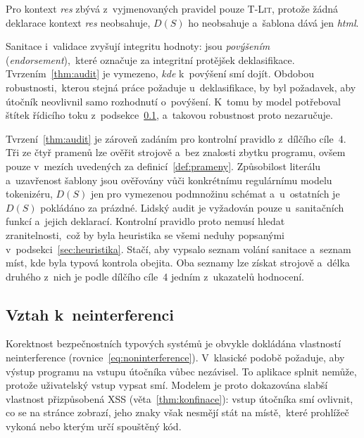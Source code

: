 Pro kontext \emph{res} zbývá z~vyjmenovaných pravidel pouze \textsc{T-Lit}, protože žádná deklarace kontext \emph{res} neobsahuje, $D(S)$ ho neobsahuje a~šablona dává jen \emph{html}.

Sanitace i~validace zvyšují integritu hodnoty: jsou \emph{povýšením} (\emph{endorsement}),~které \textcite{zdancewic2003robust} označuje za integritní protějšek deklasifikace. Tvrzením~\ref{thm:audit} je vymezeno, \emph{kde} k~povýšení smí dojít. Obdobou robustnosti,~kterou stejná práce požaduje u~deklasifikace, by byl požadavek, aby útočník neovlivnil samo rozhodnutí o~povýšení. K~tomu by model potřeboval štítek řídicího toku z~podsekce~\ref{sec:model-neinterference}, a~takovou robustnost proto nezaručuje.

Tvrzení~\ref{thm:audit} je zároveň zadáním pro kontrolní pravidlo z~dílčího cíle~4. Tři ze čtyř pramenů lze ověřit strojově a~bez znalosti zbytku programu, ovšem pouze v~mezích uvedených za definicí~\ref{def:prameny}. Způsobilost literálu a~uzavřenost šablony jsou ověřovány vůči konkrétnímu regulárnímu modelu tokenizéru, $D(S)$ jen pro vymezenou podmnožinu schémat a~u~ostatních je $D(S)$ pokládáno za prázdné. Lidský audit je vyžadován pouze u~sanitačních funkcí a~jejich deklarací. Kontrolní pravidlo proto nemusí hledat zranitelnosti,~což by byla heuristika se všemi neduhy popsanými v~podsekci~\ref{sec:heuristika}. Stačí, aby vypsalo seznam volání sanitace a~seznam míst, kde byla typová kontrola obejita. Oba seznamy lze získat strojově a~délka druhého z~nich je podle dílčího cíle~4 jedním z~ukazatelů hodnocení.

\subsection{Vztah k~neinterferenci}
\label{sec:model-neinterference}

Korektnost bezpečnostních typových systémů je obvykle dokládána vlastností neinterference (rovnice~\ref{eq:noninterference}). V~klasické podobě požaduje, aby výstup programu na vstupu útočníka vůbec nezávisel. To aplikace splnit nemůže, protože uživatelský vstup vypsat smí. Modelem je proto dokazována slabší vlastnost přizpůsobená XSS (věta~\ref{thm:konfinace}): vstup útočníka smí ovlivnit, co se na stránce zobrazí, jeho znaky však nesmějí stát na místě,~které prohlížeč vykoná nebo kterým určí spouštěný kód.

